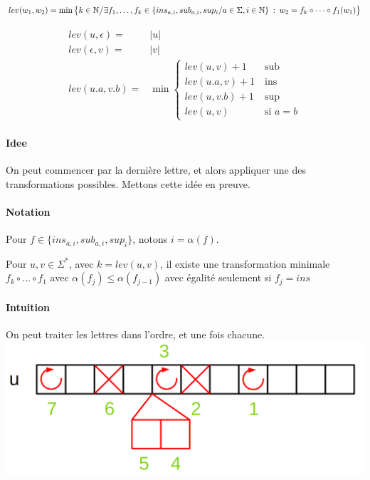 
\begin{definition}
	$$lev(w_1, w_2) = \min \left\{k \in \mathbb{N} \big/ \exists f_1, \dots, f_k \in \{ins_{a,i}, sub_{a,i}, sup_i / a\in \Sigma, i\in \mathbb{N}\} \: : \: w_2 = f_k \circ \dots \circ f_1 (w_1)\right\}$$
\end{definition}

\begin{proposition}
	$$
	\begin{array}{rl}
		lev(u, \epsilon) = & |u|\\
		lev(\epsilon, v) = & |v|\\
		lev(u.a, v.b) = & \min \left\{ \begin{array}{ll}
			lev(u,v) + 1 \quad & \text{sub}\\
			lev(u.a, v) + 1 & \text{ins}\\
			lev(u, v.b) + 1 & \text{sup}\\
			lev(u, v) & \text{si } a = b
		\end{array}\right.
	\end{array}$$
\end{proposition}


\paragraph{Idee} On peut commencer par la dernière lettre, et alors appliquer une des transformations possibles. Mettons cette idée en preuve.

\paragraph{Notation} Pour $f \in \{ins_{a,i}, sub_{a,i}, sup_i\}$, notons $i = \alpha(f)$.

\begin{lemma}
	Pour $u,v\in \Sigma^*$, avec $k = lev(u,v)$, il existe une transformation minimale $f_k \circ \dots \circ f_1$ avec $\alpha(f_j) \leq \alpha(f_{j-1})$ avec égalité seulement si $f_{j} = ins$
\end{lemma}

\paragraph{Intuition} On peut traiter les lettres dans l'ordre, et une fois chacune.\\
\includegraphics[width = 0.7\linewidth]{nouveau_dev/levenstein/tri_operation.png}

